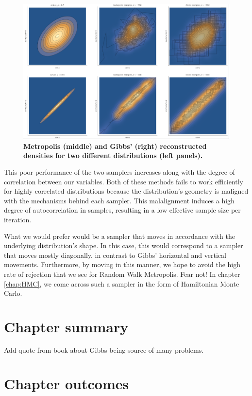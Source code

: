 \documentclass[11pt,fullpage]{book}
\begin{document}
\begin{figure}
\centerline{\includegraphics[width=1\textwidth]{Gibbs_correlationProblemCrime.png}}
\caption{\textbf{Metropolis (middle) and Gibbs' (right) reconstructed densities for two different distributions (left panels).}}\label{fig:Gibbs_correlationProblemCrime}
\end{figure}

This poor performance of the two samplers increases along with the degree of correlation between our variables. Both of these methods fails to work efficiently for highly correlated distributions because the distribution's geometry is maligned with the mechanisms behind each sampler. This malalignment induces a high degree of autocorrelation in samples, resulting in a low effective sample size per iteration.

What we would prefer would be a sampler that moves in accordance with the underlying distribution's shape. In this case, this would correspond to a sampler that moves mostly diagonally, in contrast to Gibbs' horizontal and vertical movements. Furthermore, by moving in this manner, we hope to avoid the high rate of rejection that we see for Random Walk Metropolis. Fear not! In chapter \ref{chap:HMC}, we come across such a sampler in the form of Hamiltonian Monte Carlo. 

\section{Chapter summary}
Add quote from book about Gibbs being source of many problems.
\section{Chapter outcomes}
\end{document}
